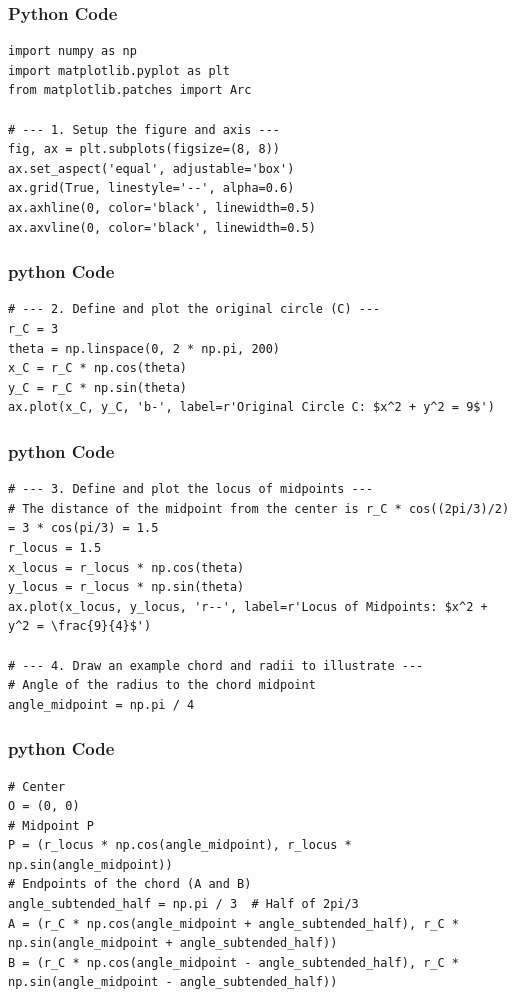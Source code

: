 \documentclass{beamer}
\begin{document}
\begin{frame}[fragile]
    \frametitle{Python Code}
    \begin{lstlisting}
import numpy as np
import matplotlib.pyplot as plt
from matplotlib.patches import Arc

# --- 1. Setup the figure and axis ---
fig, ax = plt.subplots(figsize=(8, 8))
ax.set_aspect('equal', adjustable='box')
ax.grid(True, linestyle='--', alpha=0.6)
ax.axhline(0, color='black', linewidth=0.5)
ax.axvline(0, color='black', linewidth=0.5)
\end{lstlisting}
\end{frame}

\begin{frame}[fragile]
\frametitle{python Code}
\begin{lstlisting}
# --- 2. Define and plot the original circle (C) ---
r_C = 3
theta = np.linspace(0, 2 * np.pi, 200)
x_C = r_C * np.cos(theta)
y_C = r_C * np.sin(theta)
ax.plot(x_C, y_C, 'b-', label=r'Original Circle C: $x^2 + y^2 = 9$')
\end{lstlisting}
\end{frame}

\begin{frame}[fragile]
\frametitle{python Code}
\begin{lstlisting}
# --- 3. Define and plot the locus of midpoints ---
# The distance of the midpoint from the center is r_C * cos((2pi/3)/2) = 3 * cos(pi/3) = 1.5
r_locus = 1.5
x_locus = r_locus * np.cos(theta)
y_locus = r_locus * np.sin(theta)
ax.plot(x_locus, y_locus, 'r--', label=r'Locus of Midpoints: $x^2 + y^2 = \frac{9}{4}$')

# --- 4. Draw an example chord and radii to illustrate ---
# Angle of the radius to the chord midpoint
angle_midpoint = np.pi / 4
\end{lstlisting}
\end{frame}

\begin{frame}[fragile]
\frametitle{python Code}
\begin{lstlisting}
# Center
O = (0, 0)
# Midpoint P
P = (r_locus * np.cos(angle_midpoint), r_locus * np.sin(angle_midpoint))
# Endpoints of the chord (A and B)
angle_subtended_half = np.pi / 3  # Half of 2pi/3
A = (r_C * np.cos(angle_midpoint + angle_subtended_half), r_C * np.sin(angle_midpoint + angle_subtended_half))
B = (r_C * np.cos(angle_midpoint - angle_subtended_half), r_C * np.sin(angle_midpoint - angle_subtended_half))
\end{lstlisting}
\end{frame}
\end{document}

